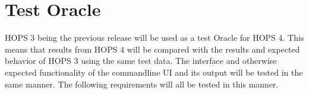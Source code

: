%
%
\section{Test Oracle}
\label{sec:oracle}
HOPS 3 being the previous release will be used as a test Oracle for HOPS 4. This means that
results from HOPS 4 will be compared with the results and expected behavior of HOPS 3 using
the same test data. The interface and otherwise expected functionality of the commandline UI
and its output will be tested in the same manner. The following requirements will all be tested
in this manner.




%
%
